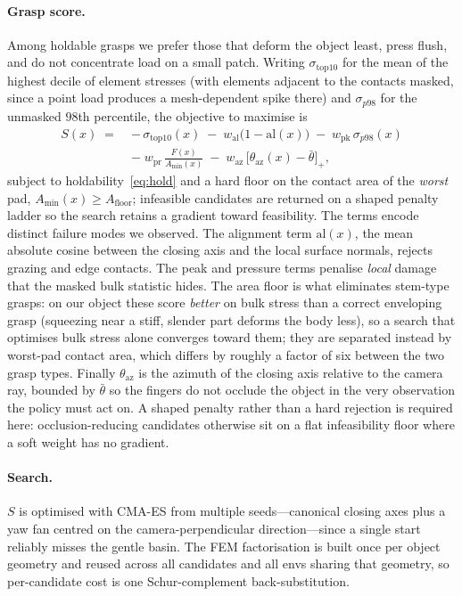 \documentclass[letterpaper, 10 pt, conference]{ieeeconf}  %
\begin{document}
\paragraph{Grasp score.}
Among holdable grasps we prefer those that deform the object least, press flush, and do not
concentrate load on a small patch. Writing $\sigma_{\text{top10}}$ for the mean of the
highest decile of element stresses (with elements adjacent to the contacts masked, since a
point load produces a mesh-dependent spike there) and $\sigma_{p98}$ for the unmasked $98$th
percentile, the objective to maximise is
\begin{equation}
  \begin{aligned}
  S(x) \;=\; &-\,\sigma_{\text{top10}}(x)
              \;-\; w_{\text{al}}\bigl(1-\mathrm{al}(x)\bigr)
              \;-\; w_{\text{pk}}\,\sigma_{p98}(x) \\[2pt]
             &-\; w_{\text{pr}}\,\frac{F(x)}{A_{\min}(x)}
              \;-\; w_{\text{az}}\,\bigl[\theta_{\text{az}}(x)-\bar\theta\bigr]_{+},
  \end{aligned}
  \label{eq:score}
\end{equation}
subject to holdability~\eqref{eq:hold} and a hard floor on the contact area of the
\emph{worst} pad, $A_{\min}(x) \ge A_{\text{floor}}$; infeasible candidates are returned on a
shaped penalty ladder so the search retains a gradient toward feasibility. The terms encode
distinct failure modes we observed. The alignment term $\mathrm{al}(x)$, the mean absolute
cosine between the closing axis and the local surface normals, rejects grazing and edge
contacts. The peak and pressure terms penalise \emph{local} damage that the masked bulk
statistic hides. The area floor is what eliminates stem-type grasps: on our object these
score \emph{better} on bulk stress than a correct enveloping grasp (squeezing near a stiff,
slender part deforms the body less), so a search that optimises bulk stress alone converges
toward them; they are separated instead by worst-pad contact area, which differs by roughly
a factor of six between the two grasp types. Finally $\theta_{\text{az}}$ is the azimuth of
the closing axis relative to the camera ray, bounded by $\bar\theta$ so the fingers do not
occlude the object in the very observation the policy must act on. A shaped penalty rather
than a hard rejection is required here: occlusion-reducing candidates otherwise sit on a flat
infeasibility floor where a soft weight has no gradient.

\paragraph{Search.}
$S$ is optimised with CMA-ES from multiple seeds---canonical closing axes plus a yaw fan
centred on the camera-perpendicular direction---since a single start reliably misses the
gentle basin. The FEM factorisation is built once per object geometry and reused across all
candidates and all envs sharing that geometry, so per-candidate cost is one Schur-complement
back-substitution.
\end{document}
